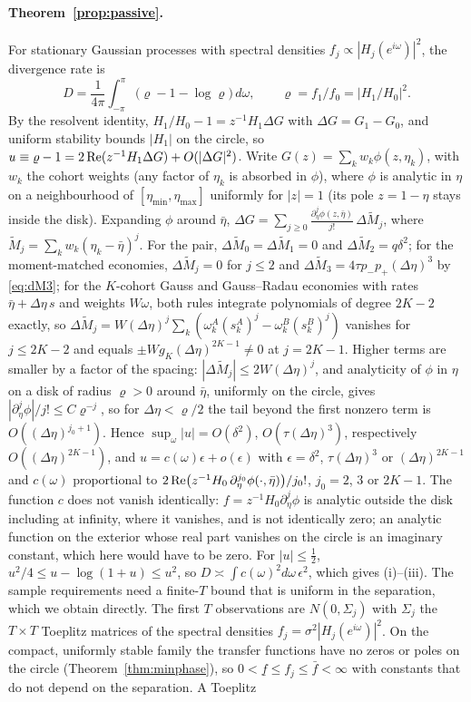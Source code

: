 \documentclass[12pt]{article}
\theoremstyle{definition}
\theoremstyle{remark}
\begin{document}
\paragraph{Theorem~\ref{prop:passive}.} For stationary Gaussian processes with spectral densities $f_j\propto|H_j(e^{i\omega})|^2$, the divergence rate is
\[
D=\frac1{4\pi}\int_{-\pi}^{\pi}\bigl(\varrho-1-\log\varrho\bigr)\,d\omega,\qquad \varrho=f_1/f_0=|H_1/H_0|^2 .
\] By the resolvent identity, $H_1/H_0-1=z^{-1}H_1\Delta G$ with $\Delta G=G_1-G_0$, and uniform stability bounds $|H_1|$ on the circle, so $u\equiv\varrho-1=2\,{\rm Re}(z^{-1}H_1\Delta G)+O(|\Delta G|^2)$. Write $G(z)=\sum_kw_k\phi(z,\eta_k)$, with $w_k$ the cohort weights (any factor of $\eta_k$ is absorbed in $\phi$), where $\phi$ is analytic in $\eta$ on a neighbourhood of $[\eta_{\min},\eta_{\max}]$ uniformly for $|z|=1$ (its pole $z=1-\eta$ stays inside the disk). Expanding $\phi$ around $\bar\eta$, $\Delta G=\sum_{j\ge0}\frac{\partial_\eta^j\phi(z,\bar\eta)}{j!}\,\Delta\tilde M_j$, where $\tilde M_j=\sum_kw_k(\eta_k-\bar\eta)^j$. For the pair, $\Delta\tilde M_0=\Delta\tilde M_1=0$ and $\Delta\tilde M_2=q\delta^2$; for the moment-matched economies, $\Delta\tilde M_j=0$ for $j\le2$ and $\Delta\tilde M_3=4\tau p_-p_+(\Delta\eta)^3$ by \eqref{eq:dM3}; for the $K$-cohort Gauss and Gauss--Radau economies with rates $\bar\eta+\Delta\eta\,s$ and weights $W\omega$, both rules integrate polynomials of degree $2K-2$ exactly, so $\Delta\tilde M_j=W(\Delta\eta)^j\sum_k(\omega^A_k(s^A_k)^j-\omega^B_k(s^B_k)^j)$ vanishes for $j\le2K-2$ and equals $\pm Wg_K(\Delta\eta)^{2K-1}\neq0$ at $j=2K-1$. Higher terms are smaller by a factor of the spacing: $|\Delta\tilde M_j|\le2W(\Delta\eta)^j$, and analyticity of $\phi$ in $\eta$ on a disk of radius $\varrho>0$ around $\bar\eta$, uniformly on the circle, gives $|\partial_\eta^j\phi|/j!\le C\varrho^{-j}$, so for $\Delta\eta<\varrho/2$ the tail beyond the first nonzero term is $O((\Delta\eta)^{j_0+1})$. Hence $\sup_\omega|u|=O(\delta^2)$, $O(\tau(\Delta\eta)^3)$, respectively $O((\Delta\eta)^{2K-1})$, and $u=c(\omega)\epsilon+o(\epsilon)$ with $\epsilon=\delta^2$, $\tau(\Delta\eta)^3$ or $(\Delta\eta)^{2K-1}$ and $c(\omega)$ proportional to $2\,{\rm Re}\bigl(z^{-1}H_0\,\partial^{j_0}_\eta\phi(\cdot,\bar\eta)\bigr)/j_0!$, $j_0=2$, $3$ or $2K-1$. The function $c$ does not vanish identically: $f=z^{-1}H_0\partial^j_\eta\phi$ is analytic outside the disk including at infinity, where it vanishes, and is not identically zero; an analytic function on the exterior whose real part vanishes on the circle is an imaginary constant, which here would have to be zero. For $|u|\le\frac12$, $u^2/4\le u-\log(1+u)\le u^2$, so $D\asymp\int c(\omega)^2d\omega\,\epsilon^2$, which gives (i)--(iii). The sample requirements need a finite-$T$ bound that is uniform in the separation, which we obtain directly. The first $T$ observations are $N(0,\Sigma_j)$ with $\Sigma_j$ the $T\times T$ Toeplitz matrices of the spectral densities $f_j=\sigma^2|H_j(e^{i\omega})|^2$. On the compact, uniformly stable family the transfer functions have no zeros or poles on the circle (Theorem~\ref{thm:minphase}), so $0<\underline f\le f_j\le\bar f<\infty$ with constants that do not depend on the separation. A Toeplitz \]
\end{document}
